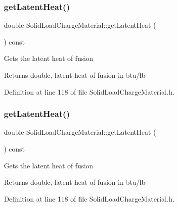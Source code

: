 \subsubsection{\texorpdfstring{get\+Latent\+Heat()}{getLatentHeat()}\hspace{0.1cm}{\footnotesize\ttfamily [2/3]}}
{\footnotesize\ttfamily double Solid\+Load\+Charge\+Material\+::get\+Latent\+Heat (\begin{DoxyParamCaption}{ }\end{DoxyParamCaption}) const\hspace{0.3cm}{\ttfamily [inline]}}

Gets the latent heat of fusion \begin{DoxyReturn}{Returns}
double, latent heat of fusion in btu/lb 
\end{DoxyReturn}


Definition at line 118 of file Solid\+Load\+Charge\+Material.\+h.

\mbox{\label{class_solid_load_charge_material_add60191bd282a9cefa4bf7a60301711b}} 
\subsubsection{\texorpdfstring{get\+Latent\+Heat()}{getLatentHeat()}\hspace{0.1cm}{\footnotesize\ttfamily [3/3]}}
{\footnotesize\ttfamily double Solid\+Load\+Charge\+Material\+::get\+Latent\+Heat (\begin{DoxyParamCaption}{ }\end{DoxyParamCaption}) const\hspace{0.3cm}{\ttfamily [inline]}}

Gets the latent heat of fusion \begin{DoxyReturn}{Returns}
double, latent heat of fusion in btu/lb 
\end{DoxyReturn}


Definition at line 118 of file Solid\+Load\+Charge\+Material.\+h.

\mbox{\label{class_solid_load_charge_material_a4be001f6e6ecbd2ad0ae1d154559cdb0}} 
